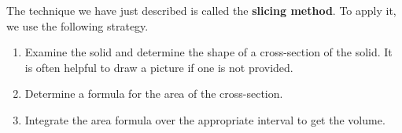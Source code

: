 \documentclass{report}
\begin{document}
    \bigbreak \noindent 
    \begin{definition}
        The technique we have just described is called the \textbf{slicing method}. To apply it, we use the following strategy.
        \begin{enumerate}
            \item Examine the solid and determine the shape of a cross-section of the solid. It is often helpful to draw a picture if one is not provided.
            \item Determine a formula for the area of the cross-section.
            \item Integrate the area formula over the appropriate interval to get the volume.
        \end{enumerate}
    \end{definition}
    \bigbreak \noindent 

    \pagebreak \bigbreak \noindent 
\end{document}
